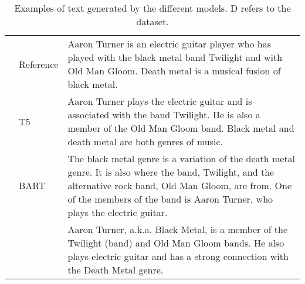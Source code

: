 \documentclass[11pt]{article}
\newcommand{\vertmulticell}[2]{\multirow{#1}{*}{\rotatebox[origin=c]{90}{#2}}}
\begin{document}
\begin{table*}[h]
\begin{center}
\begin{tabular}{llp{11cm}}
 \midrule
\vertmulticell{10}{WebNLG}  & Reference & Aaron Turner is an electric guitar player who has played with the black metal band Twilight and with Old Man Gloom. Death metal is a musical fusion of black metal.  \\
    & T5 & Aaron Turner plays the electric guitar and is associated with the band Twilight. He is also a member of the Old Man Gloom band. Black metal and death metal are both genres of music. \\
       & BART & The black metal genre is a variation of the death metal genre. It is also where the band, Twilight, and the alternative rock band, Old Man Gloom, are from. One of the members of the band is Aaron Turner, who plays the electric guitar. \\
   & \citet{harkous2020text} & Aaron Turner, a.k.a. Black Metal, is a member of the Twilight (band) and Old Man Gloom bands. He also plays electric guitar and has a strong connection with the Death Metal genre. \\
\midrule
\end{tabular} 
\caption{Examples of text generated by the different models. D refers to the dataset.}\label{tab:human_examples}
\end{center}
\end{table*} 
\end{document}
